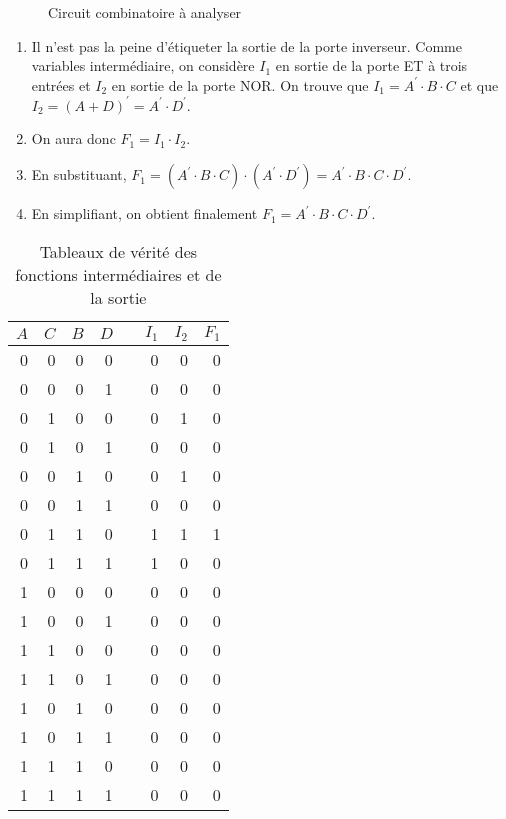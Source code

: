 \documentclass[11pt]{article}
\begin{document}
\begin{figure}[htbp]
\centering

\caption{\label{fig:org8343d56}Circuit combinatoire à analyser}
\end{figure}

\begin{enumerate}
\item Il n'est pas la peine d'étiqueter la sortie de la porte
inverseur. Comme variables intermédiaire, on considère \(I_1\) en
sortie de la porte ET à trois entrées et \(I_2\) en sortie de la
porte NOR. On trouve que \(I_1 = A^\prime \cdot B \cdot C\) et que
\(I_2 = (A + D)^\prime = A^\prime \cdot D^\prime\).

\item On aura donc \(F_1 = I_1 \cdot I_2\).

\item En substituant, \(F_1 = ( A^\prime \cdot B \cdot C ) \cdot (
   A^\prime \cdot D^\prime) = A^\prime \cdot B \cdot C \cdot
   D^\prime\).

\item En simplifiant, on obtient finalement \(F_1 = A^\prime \cdot B
   \cdot C \cdot D^\prime\).
\end{enumerate}

\begin{table}[htbp]
\caption{\label{tab:org07aa3ba}Tableaux de vérité des fonctions intermédiaires et de la sortie}
\centering
\begin{tabular}{rrrrlrrr}
\(A\) & \(C\) & \(B\) & \(D\) &  & \(I_1\) & \(I_2\) & \(F_1\)\\[0pt]
\hline
0 & 0 & 0 & 0 &  & 0 & 0 & 0\\[0pt]
0 & 0 & 0 & 1 &  & 0 & 0 & 0\\[0pt]
0 & 1 & 0 & 0 &  & 0 & 1 & 0\\[0pt]
0 & 1 & 0 & 1 &  & 0 & 0 & 0\\[0pt]
0 & 0 & 1 & 0 &  & 0 & 1 & 0\\[0pt]
0 & 0 & 1 & 1 &  & 0 & 0 & 0\\[0pt]
0 & 1 & 1 & 0 &  & 1 & 1 & 1\\[0pt]
0 & 1 & 1 & 1 &  & 1 & 0 & 0\\[0pt]
1 & 0 & 0 & 0 &  & 0 & 0 & 0\\[0pt]
1 & 0 & 0 & 1 &  & 0 & 0 & 0\\[0pt]
1 & 1 & 0 & 0 &  & 0 & 0 & 0\\[0pt]
1 & 1 & 0 & 1 &  & 0 & 0 & 0\\[0pt]
1 & 0 & 1 & 0 &  & 0 & 0 & 0\\[0pt]
1 & 0 & 1 & 1 &  & 0 & 0 & 0\\[0pt]
1 & 1 & 1 & 0 &  & 0 & 0 & 0\\[0pt]
1 & 1 & 1 & 1 &  & 0 & 0 & 0\\[0pt]
\end{tabular}
\end{table}
\end{document}
